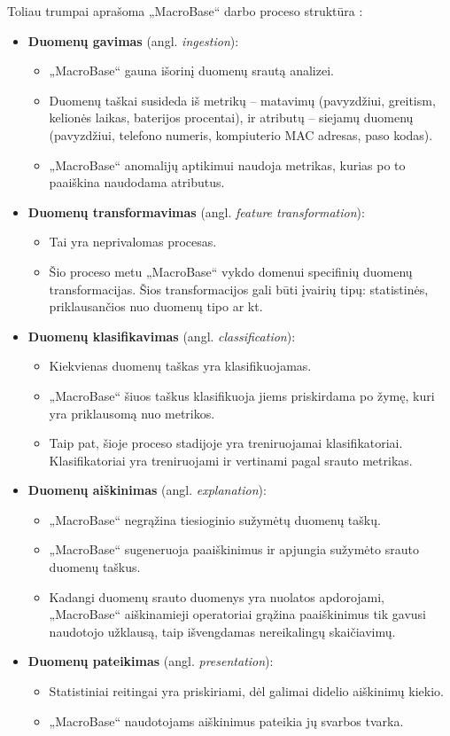 \documentclass{VUMIFPSbakalaurinis}
\begin{document}
Toliau trumpai aprašoma „MacroBase“ darbo proceso struktūra \cite{macrobase_overview, kursinis}:
\begin{itemize}
	\item \textbf{Duomenų gavimas} (angl. \textit{ingestion}):
		\begin{itemize}
			\item „MacroBase“ gauna išorinį duomenų srautą analizei.
			\item Duomenų taškai susideda iš metrikų – matavimų (pavyzdžiui, greitism, kelionės laikas, baterijos procentai), ir atributų – siejamų duomenų (pavyzdžiui, telefono numeris, kompiuterio MAC adresas, paso kodas).
			\item „MacroBase“ anomalijų aptikimui naudoja metrikas, kurias po to paaiškina naudodama atributus.
		\end{itemize}
	\item \textbf{Duomenų transformavimas} (angl. \textit{feature transformation}):
		\begin{itemize}
			\item Tai yra neprivalomas procesas.
			\item Šio proceso metu „MacroBase“ vykdo domenui specifinių duomenų transformacijas. Šios transformacijos gali būti įvairių tipų: statistinės, priklausančios nuo duomenų tipo ar kt.
		\end{itemize}
	\item \textbf{Duomenų klasifikavimas} (angl. \textit{classification}):
		\begin{itemize}
			\item Kiekvienas duomenų taškas yra klasifikuojamas.
			\item „MacroBase“ šiuos taškus klasifikuoja jiems priskirdama po žymę, kuri yra priklausomą nuo metrikos.
			\item Taip pat, šioje proceso stadijoje yra treniruojamai klasifikatoriai. Klasifikatoriai yra treniruojami ir vertinami pagal srauto metrikas.
		\end{itemize}
	\item \textbf{Duomenų aiškinimas} (angl. \textit{explanation}):
		\begin{itemize}
			\item „MacroBase“ negrąžina tiesioginio sužymėtų duomenų taškų.
			\item „MacroBase“ sugeneruoja paaiškinimus ir apjungia sužymėto srauto duomenų taškus.
			\item Kadangi duomenų srauto duomenys yra nuolatos apdorojami, „MacroBase“ aiškinamieji operatoriai grąžina paaiškinimus tik gavusi naudotojo užklausą, taip išvengdamas nereikalingų skaičiavimų.
		\end{itemize}
	\item \textbf{Duomenų pateikimas} (angl. \textit{presentation}):
		\begin{itemize}
			\item Statistiniai reitingai yra priskiriami, dėl galimai didelio aiškinimų kiekio.
			\item „MacroBase“ naudotojams aiškinimus pateikia jų svarbos tvarka.
		\end{itemize}
\end{itemize}
\end{document}
